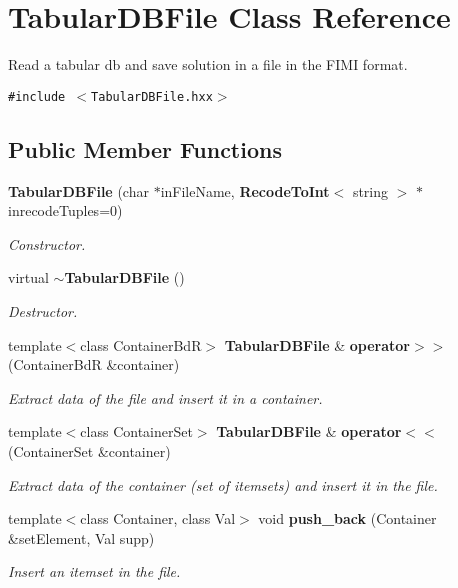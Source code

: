 \section{Tabular\-DBFile Class Reference}
\label{class_tabular_d_b_file}
Read a tabular db and save solution in a file in the FIMI format.  


{\tt \#include $<$Tabular\-DBFile.hxx$>$}

\subsection*{Public Member Functions}
\begin{CompactItemize}
\item 
{\bf Tabular\-DBFile} (char $\ast$in\-File\-Name, {\bf Recode\-To\-Int}$<$ string $>$ $\ast$inrecode\-Tuples=0)
\begin{CompactList}\small\item\em Constructor. \item\end{CompactList}\item 
virtual {\bf $\sim$Tabular\-DBFile} ()
\begin{CompactList}\small\item\em Destructor. \item\end{CompactList}\item 
template$<$class Container\-Bd\-R$>$ {\bf Tabular\-DBFile} \& {\bf operator$>$$>$} (Container\-Bd\-R \&container)
\begin{CompactList}\small\item\em Extract data of the file and insert it in a container. \item\end{CompactList}\item 
template$<$class Container\-Set$>$ {\bf Tabular\-DBFile} \& {\bf operator$<$$<$} (Container\-Set \&container)
\begin{CompactList}\small\item\em Extract data of the container (set of itemsets) and insert it in the file. \item\end{CompactList}\item 
template$<$class Container, class Val$>$ void {\bf push\_\-back} (Container \&set\-Element, Val supp)
\begin{CompactList}\small\item\em Insert an itemset in the file. \item\end{CompactList}\item 

\end{CompactItemize}
